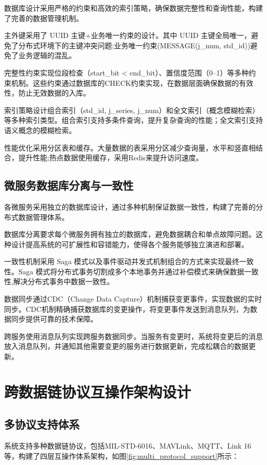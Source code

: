 数据库设计采用严格的约束和高效的索引策略，确保数据完整性和查询性能，构建了完善的数据管理机制。

主外键采用了 UUID 主键+业务唯一约束的设计。其中 UUID 主键全局唯一，避免了分布式环境下的主键冲突问题;业务唯一约束(MESSAGE(j\_num, std\_id))避免了业务逻辑的混乱。

完整性约束实现位段检查（start\_bit < end\_bit）、置信度范围（0–1）等多种约束机制。这些约束通过数据库的CHECK约束实现，在数据层面确保数据的有效性，防止无效数据的入库。

索引策略设计组合索引（std\_id, j\_series, j\_num）和全文索引（概念模糊检索）等多种索引类型。组合索引支持多条件查询，提升复杂查询的性能；全文索引支持语义概念的模糊检索。

性能优化采用分区表和缓存。大量数据的表采用分区减少查询量，水平和竖直相结合，提升性能;热点数据使用缓存，采用Redis来提升访问速度。

\subsection{微服务数据库分离与一致性}

各微服务采用独立的数据库设计，通过多种机制保证数据一致性，构建了完善的分布式数据管理体系。

数据库分离要求每个微服务拥有独立的数据库，避免数据耦合和单点故障问题。这种设计提高系统的可扩展性和容错能力，使得各个服务能够独立演进和部署。

一致性机制采用 Saga 模式以及事件驱动并发式机制组合的方式来实现最终一致性。Saga 模式将分布式事务切割成多个本地事务并通过补偿模式来确保数据一致性,解决分布式事务中数据一致性。

数据同步通过CDC（Change Data Capture）机制捕获变更事件，实现数据的实时同步。CDC机制精确捕获数据库的变更操作，将变更事件发送到消息队列，为数据同步提供可靠的技术保障。

跨服务使用消息队列实现跨服务数据同步。当服务有变更时，系统将变更后的消息放入消息队列，并通知其他需要变更的服务进行数据更新，完成松耦合的数据更新。

\section{跨数据链协议互操作架构设计}

\subsection{多协议支持体系}

系统支持多种数据链协议，包括MIL-STD-6016、MAVLink、MQTT、Link 16等，构建了四层互操作体系架构，如图\ref{fig:multi_protocol_support}所示：

